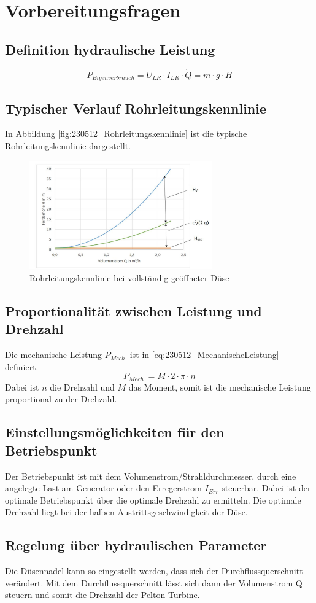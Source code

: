 \section{Vorbereitungsfragen}
\label{sec:Vorbereitungsfragen}
\subsection{Definition hydraulische Leistung}
%
\begin{equation}
	P_{ Eigenverbrauch }= U_{ LR} \cdot I_{ LR }\cdot \dot Q = \dot m \cdot g \cdot H
\label{eq:2}
\end{equation}
%
\subsection{Typischer Verlauf Rohrleitungskennlinie}
In Abbildung \autoref{fig:230512_Rohrleitungskennlinie} ist die typische Rohrleitungskennlinie dargestellt.
%
\begin{figure}[!ht]
		\centering
		\includegraphics[width=0.7\textwidth]{Abbildungen/Rohrleitungskennlinie}
		\caption{Rohrleitungskennlinie bei vollständig geöffneter Düse}
		\label{fig:230512_Rohrleitungskennlinie}
\end{figure}
%
\subsection{Proportionalität zwischen Leistung und Drehzahl}
\label{subsec:P_mech-n}
Die mechanische Leistung $P_{Mech.}$ ist in \autoref{eq:230512_MechanischeLeistung} definiert.
%
\begin{equation}
	P_{Mech.}= M \cdot 2 \cdot \pi \cdot n
\label{eq:230512_MechanischeLeistung}
\end{equation}
%
Dabei ist $n$ die Drehzahl und $M$ das Moment, somit ist die mechanische Leistung proportional zu der Drehzahl.
\subsection{Einstellungsmöglichkeiten für den Betriebspunkt}
Der Betriebspunkt ist mit dem Volumenstrom/Strahldurchmesser, durch eine angelegte Last am Generator oder den Erregerstrom $I_{Err}$ steuerbar. Dabei ist der optimale Betriebspunkt über die optimale Drehzahl zu ermitteln. Die optimale Drehzahl liegt bei der halben Austrittsgeschwindigkeit der Düse.

\subsection{Regelung über hydraulischen Parameter}
Die Düsennadel kann so eingestellt werden, dass sich der Durchflussquerschnitt verändert. Mit dem Durchflussquerschnitt lässt sich dann der Volumenstrom Q steuern und somit die Drehzahl der Pelton-Turbine.